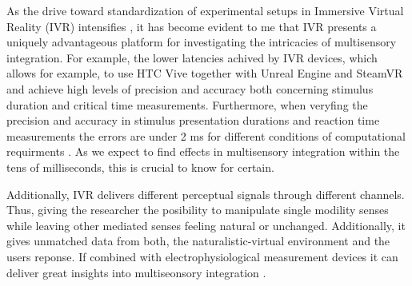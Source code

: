 \documentclass[12pt,oneside,openright]{report}
\begin{document}

As the drive toward standardization of experimental setups in Immersive Virtual Reality (IVR) intensifies \parencite{Vasser2020GuidelinesFI,deGelder2018VirtualRA,Schne2023TheRO,vr_respont}, it has become evident to me that IVR presents a uniquely advantageous platform for investigating the intricacies of multisensory integration. For example, the lower latencies achived by IVR devices, which allows for example, to use HTC Vive together with Unreal Engine and SteamVR and achieve high levels of precision and accuracy both concerning stimulus duration and critical time measurements. Furthermore, when veryfing the precision and accuracy in stimulus presentation durations and reaction time measurements the errors are under 2 ms for different conditions of computational requirments \parencite{vr_respont}. As we expect to find effects in multisensory integration within the tens of milliseconds, this is crucial to know for certain. 

Additionally, IVR delivers different perceptual signals through different channels. Thus, giving the researcher the posibility to manipulate single modility senses while leaving other mediated senses feeling natural or unchanged. Additionally, it gives unmatched data from both, the naturalistic-virtual environment and the users reponse. If combined with electrophysiological measurement devices it can deliver great insights into multiseonsory integration \parencite{Vasser2020GuidelinesFI}.


\end{document}

